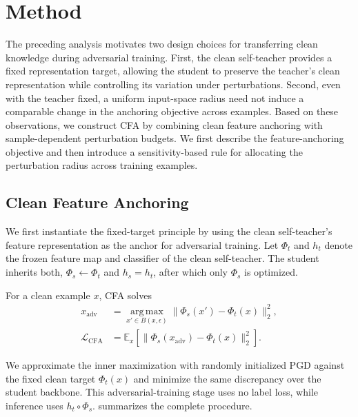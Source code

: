 \documentclass{article} %
\theoremstyle{plain}
\begin{document}
\section{Method}
\label{sec:method}

The preceding analysis motivates two design choices for transferring clean
knowledge during adversarial training. First, the clean self-teacher provides
a fixed representation target, allowing the student to preserve the teacher's
clean representation while controlling its variation under perturbations.
Second, even with the teacher fixed, a uniform input-space radius need not
induce a comparable change in the anchoring objective across examples.
Based on these observations, we construct CFA by combining clean feature
anchoring with sample-dependent perturbation budgets. We first describe the
feature-anchoring objective and then introduce a sensitivity-based rule for
allocating the perturbation radius across training examples.


\subsection{Clean Feature Anchoring}
\label{sec:anchor}

We first instantiate the fixed-target principle by using the clean
self-teacher's feature representation as the anchor for adversarial training.
Let \(\Phi_t\) and \(h_t\) denote the frozen feature map and classifier of
the clean self-teacher. The student inherits both,
\(\Phi_s\leftarrow\Phi_t\) and \(h_s=h_t\), after which only \(\Phi_s\)
is optimized.

For a clean example \(x\), CFA solves
\begin{equation}
\begin{aligned}
x_{\mathrm{adv}}
&=
\operatorname*{arg\,max}_{x'\in B(x,\epsilon)}
\lVert\Phi_s(x')-\Phi_t(x)\rVert_2^2,\\
\mathcal L_{\mathrm{CFA}}
&=
\mathbb E_x
\left[
\lVert\Phi_s(x_{\mathrm{adv}})-\Phi_t(x)\rVert_2^2
\right].
\end{aligned}
\label{eqn:anchor}
\end{equation}

We approximate the inner maximization with randomly initialized PGD against
the fixed clean target \(\Phi_t(x)\) and minimize the same discrepancy over
the student backbone. This adversarial-training stage uses no label loss,
while inference uses \(h_t\circ\Phi_s\).
 summarizes the complete procedure.
\end{document}
